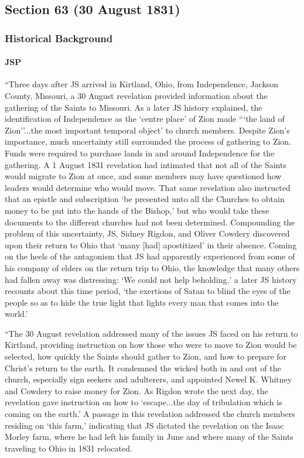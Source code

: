 \subsection{Section 63 (30 August 1831)}
	\label{DC63}
	
	\subsubsection{Historical Background}
		\label{DC63-HB}
		
		\paragraph{JSP}
		
			``Three days after JS arrived in Kirtland, Ohio, from Independence, Jackson County, Missouri, a 30 August revelation provided information about the gathering of the Saints to Missouri. As a later JS history explained, the identification of Independence as the `centre place' of Zion made ```the land of Zion''...the most important temporal object' to church members. Despite Zion's importance, much uncertainty still surrounded the process of gathering to Zion. Funds were required to purchase lands in and around Independence for the gathering. A 1 August 1831 revelation had intimated that not all of the Saints would migrate to Zion at once, and some members may have questioned how leaders would determine who would move. That same revelation also instructed that an epistle and subscription `be presented unto all the Churches to obtain money to be put into the hands of the Bishop,' but who would take these documents to the different churches had not been determined. Compounding the problem of this uncertainty, JS, Sidney Rigdon, and Oliver Cowdery discovered upon their return to Ohio that `many [had] apostitized' in their absence. Coming on the heels of the antagonism that JS had apparently experienced from some of his company of elders on the return trip to Ohio, the knowledge that many others had fallen away was distressing: `We could not help beholding,' a later JS history recounts about this time period, `the exertions of Satan to blind the eyes of the people so as to hide the true light that lights every man that comes into the world.'
			
			``The 30 August revelation addressed many of the issues JS faced on his return to Kirtland, providing instruction on how those who were to move to Zion would be selected, how quickly the Saints should gather to Zion, and how to prepare for Christ's return to the earth. It condemned the wicked both in and out of the church, especially sign seekers and adulterers, and appointed Newel K. Whitney and Cowdery to raise money for Zion. As Rigdon wrote the next day, the revelation gave instruction on how to `escape...the day of tribulation which is coming on the earth.' A passage in this revelation addressed the church members residing on `this farm,' indicating that JS dictated the revelation on the Isaac Morley farm, where he had left his family in June and where many of the Saints traveling to Ohio in 1831 relocated.
			

